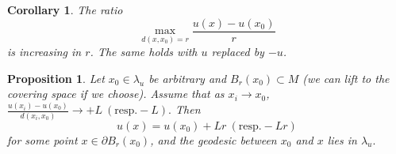 \documentclass{ip-journal}
\newtheorem{proposition}[theorem]{Proposition}
\newtheorem{corollary}[theorem]{Corollary}
\theoremstyle{definition}
\numberwithin{equation}{section}
\begin{document}
%
%
%
\begin{corollary}\label{comocones2}
The ratio
\[
\max_{d(x,x_0)=r}\frac{u(x)-u(x_0)}{r}
\]
is increasing in $r$. The same holds with $u$ replaced by $-u$.
\end{corollary} 

\begin{proposition}\label{comocones2}  Let $x_0 \in \lambda_u$ be arbitrary and $B_r(x_0) \subset M$ (we can lift to the covering space if we choose). Assume that as $ x_i \rightarrow x_0$, 
$ \frac{u(x_i)-u(x_0)}{d(x_i,x_0)} \rightarrow +L \ (\mbox{resp.} -L).$  
Then 
\[
u(x)= u(x_0) + Lr \ (\mbox{resp.} -Lr)
\]
 for some point $x \in \partial B_r(x_0)$, and the geodesic between $x_0$ and $x$ lies in $\lambda_u.$
\end{proposition}
\end{document}
